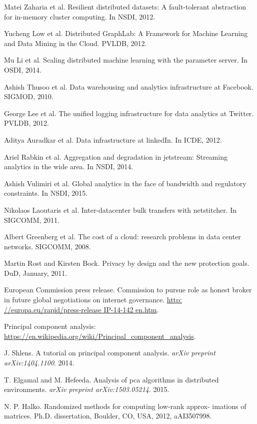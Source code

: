 \begin{thebibliography}{1}

Matei Zaharia et al. Resilient distributed datasets: A fault-tolerant abstraction for in-memory cluster computing. In NSDI, 2012.


Yucheng Low et al. Distributed GraphLab: A Framework for Machine Learning and Data Mining in the Cloud. PVLDB, 2012.

Mu Li et al. Scaling distributed machine learning with the parameter server. In OSDI, 2014.

Ashish Thusoo et al. Data warehousing and analytics infrastructure at Facebook. SIGMOD, 2010.

George Lee et al. The unified logging infrastructure for data analytics at Twitter. PVLDB, 2012.

Aditya Auradkar et al. Data infrastructure at linkedIn. In ICDE, 2012.

Ariel Rabkin et al. Aggregation and degradation in jetstream: Streaming analytics in the wide area. In NSDI, 2014.

Ashish Vulimiri et al. Global analytics in the face of bandwidth and regulatory constraints. In NSDI, 2015.

Nikolaos Laoutaris et al. Inter-datacenter bulk transfers with netstitcher. In SIGCOMM, 2011.

Albert Greenberg et al. The cost of a cloud: research problems in data center networks. SIGCOMM, 2008.

Martin Rost and Kirsten Bock. Privacy by design and the new protection goals. DuD, January, 2011.

European Commission press release. Commission to pursue role as honest broker in future global negotiations on internet governance. \url{http: //europa.eu/rapid/press-release IP-14-142 en.htm}.

Principal component analysis: \url{https://en.wikipedia.org/wiki/Principal_component_analysis}.

J. Shlens. A tutorial on principal component analysis. \textit{arXiv preprint
arXiv:1404.1100}. 2014.

T. Elgamal and M. Hefeeda. Analysis of pca algorithms in distributed environments. \textit{arXiv preprint arXiv:1503.05214}. 2015.

N. P. Halko. Randomized methods for computing low-rank approx- imations of matrices. Ph.D. dissertation, Boulder, CO, USA, 2012, aAI3507998.


\end{thebibliography}
